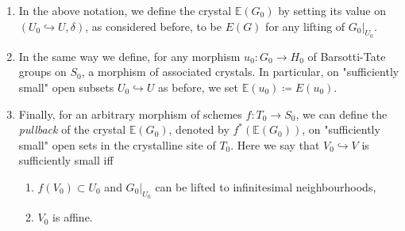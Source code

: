 \documentclass[../Main]{subfiles}
\begin{document}
\begin{defn}[]\leavevmode\vspace{-.2\baselineskip}
\begin{enumerate}
\item In the above notation, we define the crystal $\mathbb{E}(G_0)$
	by setting its value on $\left(U_0 \hookrightarrow U, \delta\right)$, as considered
	before, to be $E(G)$ for any lifting of $\left.G_0\right|_{U_0}$.

\item In the same way we define, for any morphism $u_0\colon G_0 \to H_0$ of 
	Barsotti-Tate groups on $S_0$, a morphism of associated crystals.
	In particular, on "sufficiently
	small" open subsets $U_0 \hookrightarrow U$ as before,
	we set $\mathbb{E}(u_0) \coloneqq E(u_0)$.

\item Finally, for an arbitrary morphism of schemes $f\colon T_0 \to S_0$,
	we can define the {\em pullback} of the crystal $\mathbb{E}(G_0)$, denoted
	by $f^* \left( \mathbb{E}(G_0) \right)$, on "sufficiently small" open
	sets in the crystalline site of $T_0$.
	Here we say that $V_0 \hookrightarrow V$ is sufficiently small iff
\begin{enumerate}
	\item $f(V_0) \subset U_0$ and $\left.G_0\right|_{U_0}$ can be lifted to infinitesimal
		neighbourhoods,

	\item $V_0$ is affine.
\end{enumerate}
\end{enumerate}
\end{defn}
\end{document}
